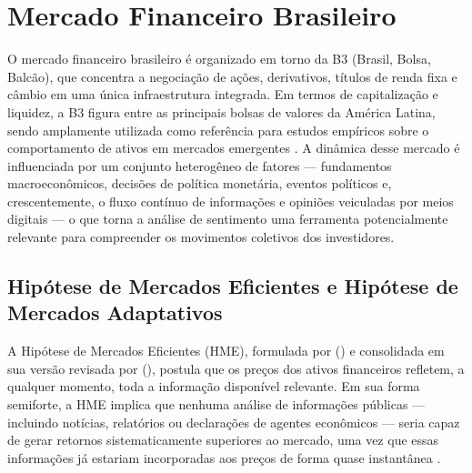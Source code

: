 
\section{Mercado Financeiro Brasileiro}
\label{sec:mercado_financeiro}

O mercado financeiro brasileiro é organizado em torno da B3 (Brasil, Bolsa, Balcão), que concentra a negociação de ações, derivativos, títulos de renda fixa e câmbio em uma única infraestrutura integrada. Em termos de capitalização e liquidez, a B3 figura entre as principais bolsas de valores da América Latina, sendo amplamente utilizada como referência para estudos empíricos sobre o comportamento de ativos em mercados emergentes \cite{costajr1994,yoshinaga2012}. A dinâmica desse mercado é influenciada por um conjunto heterogêneo de fatores --- fundamentos macroeconômicos, decisões de política monetária, eventos políticos e, crescentemente, o fluxo contínuo de informações e opiniões veiculadas por meios digitais --- o que torna a análise de sentimento uma ferramenta potencialmente relevante para compreender os movimentos coletivos dos investidores.


\subsection{Hipótese de Mercados Eficientes e Hipótese de Mercados Adaptativos}
\label{subsec:hme_hma}

A Hipótese de Mercados Eficientes (HME), formulada por \citeauthor{fama1970} (\citeyear{fama1970}) e consolidada em sua versão revisada por \citeauthor{fama1991} (\citeyear{fama1991}), postula que os preços dos ativos financeiros refletem, a qualquer momento, toda a informação disponível relevante. Em sua forma semiforte, a HME implica que nenhuma análise de informações públicas --- incluindo notícias, relatórios ou declarações de agentes econômicos --- seria capaz de gerar retornos sistematicamente superiores ao mercado, uma vez que essas informações já estariam incorporadas aos preços de forma quase instantânea \cite{fama1970,grossman1980}.


